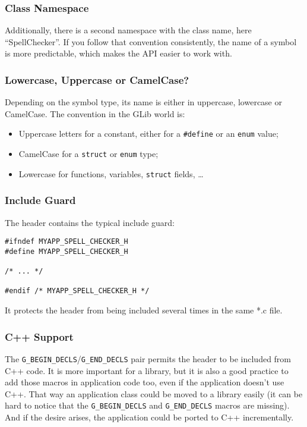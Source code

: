 \subsubsection{Class Namespace}
Additionally, there is a second namespace with the class name, here ``SpellChecker''. If you follow that convention consistently, the name of a symbol is more predictable, which makes the API easier to work with.

\subsubsection{Lowercase, Uppercase or CamelCase?}
Depending on the symbol type, its name is either in uppercase, lowercase or CamelCase. The convention in the GLib world is:
\begin{itemize}
  \item Uppercase letters for a constant, either for a \lstinline{#define} or an \lstinline{enum} value;
  \item CamelCase for a \lstinline{struct} or \lstinline{enum} type;
  \item Lowercase for functions, variables, \lstinline{struct} fields, …
\end{itemize}

\subsubsection{Include Guard}
The header contains the typical include guard:

\begin{lstlisting}
#ifndef MYAPP_SPELL_CHECKER_H
#define MYAPP_SPELL_CHECKER_H

/* ... */

#endif /* MYAPP_SPELL_CHECKER_H */
\end{lstlisting}

It protects the header from being included several times in the same *.c file.

\subsubsection{C++ Support}
The \lstinline{G_BEGIN_DECLS}/\lstinline{G_END_DECLS} pair permits the header to be included from C++ code. It is more important for a library, but it is also a good practice to add those macros in application code too, even if the application doesn't use C++. That way an application class could be moved to a library easily (it can be hard to notice that the \lstinline{G_BEGIN_DECLS} and \lstinline{G_END_DECLS} macros are missing). And if the desire arises, the application could be ported to C++ incrementally.

